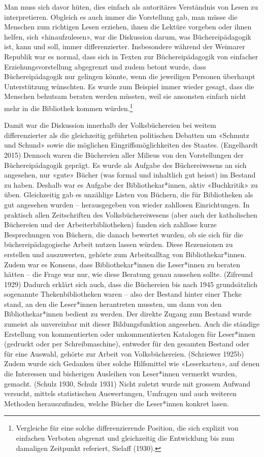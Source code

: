 \documentclass[a4paper,
fontsize=11pt,
oneside,
numbers=noperiodatend,
parskip=half-,
bibliography=totoc,
final
]{scrartcl}
\begin{document}
Man muss sich davor hüten, dies einfach als autoritäres Verständnis von
Lesen zu interpretieren. Obgleich es auch immer die Vorstellung gab, man
müsse die Menschen zum richtigen Lesen erziehen, ihnen die Lektüre
vorgeben oder ihnen helfen, sich «hinaufzulesen», war die Diskussion
darum, was Büchereipädagogik ist, kann und soll, immer differenzierter.
Insbesondere während der Weimarer Republik war es normal, dass sich in
Texten zur Büchereipädagogik von einfacher Erziehungsvorstellung
abgegrenzt und zudem betont wurde, dass Büchereipädagogik nur gelingen
könnte, wenn die jeweiligen Personen überhaupt Unterstützung wünschten.
Es wurde zum Beispiel immer wieder gesagt, dass die Menschen behutsam
beraten werden müssten, weil sie ansonsten einfach nicht mehr in die
Bibliothek kommen würden.\footnote{Vergleiche für eine solche
  differenzierende Position, die sich explizit von einfachen Verboten
  abgrenzt und gleichzeitig die Entwicklung bis zum damaligen Zeitpunkt
  referiert, Sielaff (1930).}

Damit war die Diskussion innerhalb der Volksbüchereien bei weitem
differenzierter als die gleichzeitig geführten politischen Debatten um
«Schmutz und Schund» sowie die möglichen Eingriffsmöglichkeiten des
Staates. (Engelhardt 2015) Dennoch waren die Büchereien aller Milieus
von den Vorstellungen der Büchereipädagogik geprägt. Es wurde als
Aufgabe des Büchereiwesens an sich angesehen, nur «gute» Bücher (was
formal und inhaltlich gut heisst) im Bestand zu haben. Deshalb war es
Aufgabe der Bibliothekar*innen, aktiv «Buchkritik» zu üben. Gleichzeitig
gab es unzählige Listen von Büchern, die für Bibliotheken als gut
angesehen wurden -- herausgegeben von wieder zahllosen Einrichtungen. In
praktisch allen Zeitschriften des Volksbüchereiwesens (aber auch der
katholischen Büchereien und der Arbeiterbibliotheken) fanden sich
zahllose kurze Besprechungen von Büchern, die danach bewertet wurden, ob
sie sich für die büchereipädagogische Arbeit nutzen lassen würden. Diese
Rezensionen zu erstellen und auszuwerten, gehörte zum Arbeitsalltag von
Bibliothekar*innen. Zudem war es Konsens, dass Bibliothekar*innen die
Leser*innen zu beraten hätten -- die Frage war nur, wie diese Beratung
genau aussehen sollte. (Zifreund 1929) Dadurch erklärt sich auch, dass
die Büchereien bis nach 1945 grundsätzlich sogenannte Thekenbibliotheken
waren -- also der Bestand hinter einer Theke stand, an den die
Leser*innen herantreten mussten, um dann von den Bibliothekar*innen
bedient zu werden. Der direkte Zugang zum Bestand wurde zumeist als
unvereinbar mit dieser Bildungsfunktion angesehen. Auch die ständige
Erstellung von kommentierten oder unkommentierten Katalogen für
Leser*innen (gedruckt oder per Schreibmaschine), entweder für den
gesamten Bestand oder für eine Auswahl, gehörte zur Arbeit von
Volksbüchereien. (Schriewer 1925b) Zudem wurde sich Gedanken über solche
Hilfsmittel wie «Leserkarten», auf denen die Interessen und bisherigen
Ausleihen von Leser*innen vermerkt wurden, gemacht. (Schulz 1930, Schulz
1931) Nicht zuletzt wurde mit grossem Aufwand versucht, mittels
statistischen Auswertungen, Umfragen und auch weiteren Methoden
herauszufinden, welche Bücher die Leser*innen konkret lasen.
\end{document}
